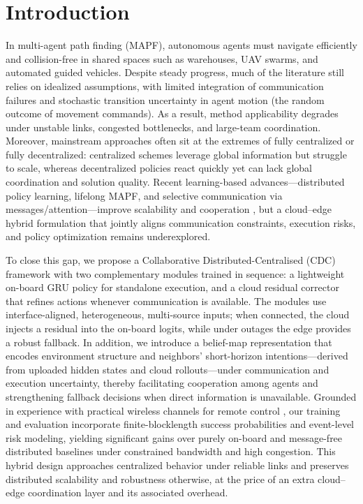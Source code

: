 \documentclass[conference]{IEEEtran}
\begin{document}
\section{Introduction}
In multi-agent path finding (MAPF), autonomous agents must navigate efficiently and collision-free in shared spaces such as warehouses, UAV swarms, and automated guided vehicles. Despite steady progress, much of the literature still relies on idealized assumptions, with limited integration of communication failures and stochastic transition uncertainty in agent motion (the random outcome of movement commands). As a result, method applicability degrades under unstable links, congested bottlenecks, and large-team coordination. Moreover, mainstream approaches often sit at the extremes of fully centralized or fully decentralized: centralized schemes leverage global information but struggle to scale, whereas decentralized policies react quickly yet can lack global coordination and solution quality. Recent learning-based advances—distributed policy learning, lifelong MAPF, and selective communication via messages/attention—improve scalability and cooperation \cite{sartoretti2019primal,9424371,damani2021primal,lin2023sacha}, but a cloud–edge hybrid formulation that jointly aligns communication constraints, execution risks, and policy optimization remains underexplored.

To close this gap, we propose a Collaborative Distributed-Centralised (CDC) framework with two complementary modules trained in sequence: a lightweight on-board GRU policy for standalone execution, and a cloud residual corrector that refines actions whenever communication is available. The modules use interface-aligned, heterogeneous, multi-source inputs; when connected, the cloud injects a residual into the on-board logits, while under outages the edge provides a robust fallback. In addition, we introduce a belief-map representation that encodes environment structure and neighbors’ short-horizon intentions—derived from uploaded hidden states and cloud rollouts—under communication and execution uncertainty, thereby facilitating cooperation among agents and strengthening fallback decisions when direct information is unavailable. Grounded in experience with practical wireless channels for remote control \cite{10702475}, our training and evaluation incorporate finite-blocklength success probabilities \cite{9134368} and event-level risk modeling, yielding significant gains over purely on-board and message-free distributed baselines under constrained bandwidth and high congestion. This hybrid design approaches centralized behavior under reliable links and preserves distributed scalability and robustness otherwise, at the price of an extra cloud–edge coordination layer and its associated overhead.
\end{document}
